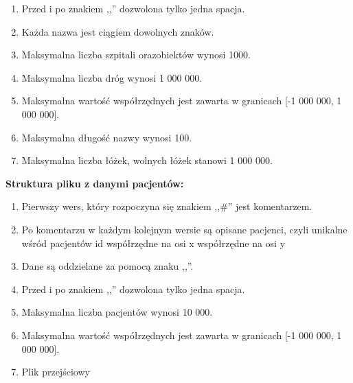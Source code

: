 ﻿\documentclass{article}
\begin{document}
\begin{enumerate}
\item  Przed i po znakiem ,,{\textbar}'' dozwolona tylko jedna spacja.

\item  Ka\.{z}da nazwa jest ci\k{a}giem dowolnych znak\'{o}w.

\item  Maksymalna liczba szpitali orazobiekt\'{o}w wynosi 1000.

\item  Maksymalna liczba dr\'{o}g wynosi 1 000 000.

\item  Maksymalna warto\'{s}\'{c} wsp\'{o}{\l}rz\k{e}dnych jest zawarta w granicach [-1 000 000, 1 000 000].

\item  Maksymalna d{\l}ugo\'{s}\'{c} nazwy wynosi 100.

\item  Maksymalna liczba {\l}\'{o}\.{z}ek, wolnych {\l}\'{o}\.{z}ek stanowi 1 000 000.
\end{enumerate}



\noindent \textbf{Struktura pliku z danymi pacjent\'{o}w:}

\begin{enumerate}
\item  Pierwszy wers, kt\'{o}ry rozpoczyna si\k{e} znakiem ,,\#'' jest komentarzem.

\item  Po komentarzu w ka\.{z}dym kolejnym wersie s\k{a} opisane pacjenci, czyli unikalne w\'{s}r\'{o}d pacjent\'{o}w id{\textbar} wsp\'{o}{\l}rz\k{e}dne na osi x {\textbar} wsp\'{o}{\l}rz\k{e}dne na osi y

\item  Dane s\k{a} oddzielane za pomoc\k{a} znaku ,,{\textbar}''.

\item  Przed i po znakiem ,,{\textbar}'' dozwolona tylko jedna spacja.

\item  Maksymalna liczba pacjent\'{o}w wynosi 10 000.

\item  Maksymalna warto\'{s}\'{c} wsp\'{o}{\l}rz\k{e}dnych jest zawarta w granicach [-1 000 000, 1 000 000].

\item  Plik przej\'{s}ciowy
\end{enumerate}

\noindent
\end{document}
